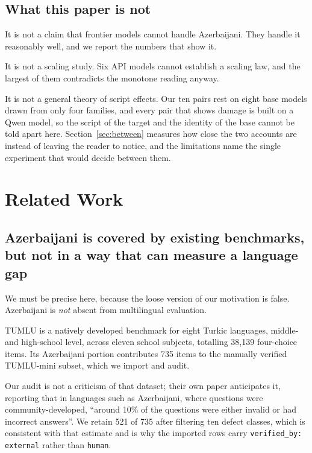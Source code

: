 \documentclass[final]{clv2025}
\begin{document}
\subsection{What this paper is not}

It is not a claim that frontier models cannot handle Azerbaijani. They handle
it reasonably well, and we report the numbers that show it.

It is not a scaling study. Six API models cannot establish a scaling law, and
the largest of them contradicts the monotone reading anyway.

It is not a general theory of script effects. Our ten pairs rest on eight base
models drawn from only four families, and every pair that shows damage is built
on a Qwen model, so the script of the target and the identity of the base cannot
be told apart here. Section~\ref{sec:between} measures how close the two
accounts are instead of leaving the reader to notice, and the limitations name
the single experiment that would decide between them.

\section{Related Work}

\subsection{Azerbaijani is covered by existing benchmarks, but not in a way
that can measure a language gap}

We must be precise here, because the loose version of our motivation is false.
Azerbaijani is \emph{not} absent from multilingual evaluation.

TUMLU \cite{isbarov2025tumlu} is a natively developed benchmark for eight
Turkic languages, middle- and high-school level, across eleven school subjects,
totalling 38,139 four-choice items. Its Azerbaijani portion contributes 735
items to the manually verified TUMLU-mini subset, which we import and audit.

Our audit is not a criticism of that dataset; their own paper anticipates it,
reporting that in languages such as Azerbaijani, where questions were
community-developed, ``around 10\% of the questions were either invalid or had
incorrect answers''. We retain 521 of 735 after filtering ten defect classes,
which is consistent with that estimate and is why the imported rows carry
\texttt{verified\_by: external} rather than \texttt{human}.
\end{document}
